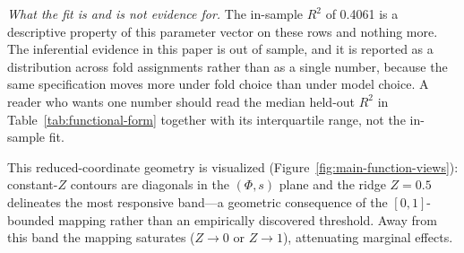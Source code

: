 \documentclass[11pt]{article}
\begin{document}
\emph{What the fit is and is not evidence for.} The in-sample $R^2$ of \num{0.4061} is a descriptive property of this parameter vector on these rows and nothing more. The inferential evidence in this paper is out of sample, and it is reported as a distribution across fold assignments rather than as a single number, because the same specification moves more under fold choice than under model choice. A reader who wants one number should read the median held-out $R^2$ in Table~\ref{tab:functional-form} together with its interquartile range, not the in-sample fit.

This reduced-coordinate geometry is visualized (Figure~\ref{fig:main-function-views}): constant-$Z$ contours are diagonals in the $(\Phi,s)$ plane and the ridge $Z=0.5$ delineates the most responsive band---a geometric consequence of the $[0,1]$-bounded mapping rather than an empirically discovered threshold. Away from this band the mapping saturates ($Z\to 0$ or $Z\to 1$), attenuating marginal effects.
\end{document}
